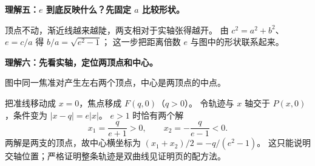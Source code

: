 \clearpage
\begin{explanationbox}
\textbf{理解五：$e$ 到底反映什么？先固定 $a$ 比较形状。}

顶点不动，渐近线越来越陡，两支相对于实轴张得越开。
由 $c^2=a^2+b^2$、$e=c/a$ 得 $b/a=\sqrt{e^2-1}$；
这一步把距离倍数 $e$ 与图中的形状联系起来。
\end{explanationbox}
\clearpage
\begin{explanationbox}
\textbf{理解六：先看实轴，定位两顶点和中心。}

图中同一焦准对产生左右两个顶点，中心是两顶点的中点。

把准线移动成 $x=0$，焦点移成 $F(q,0)$（$q>0$）。
令轨迹与 $x$ 轴交于 $P(x,0)$，条件变为 $|x-q|=e|x|$。
$e>1$ 时恰有两个解
\[
\boxed{x_1=\frac q{e+1}>0},\qquad
\boxed{x_2=-\frac q{e-1}<0}.
\]
两解是两支的顶点，故中心横坐标为 $(x_1+x_2)/2=-q/(e^2-1)$。
这只能说明交轴位置；严格证明整条轨迹是双曲线见证明页的配方法。
\end{explanationbox}
